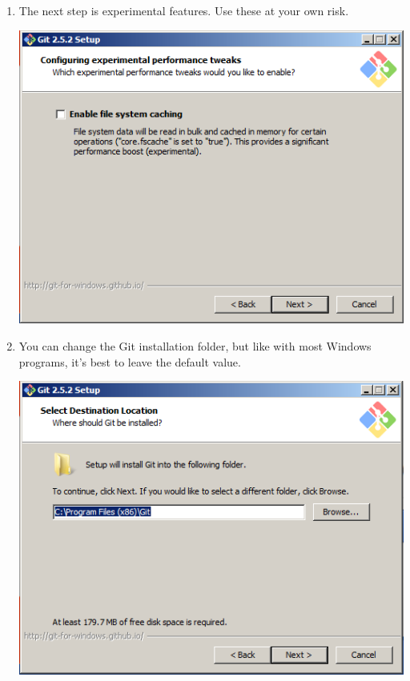 \documentclass[11pt,fleqn]{article}
\theoremstyle{definition}
\begin{document}
\begin{enumerate}[Step 1.]
\item The next step is experimental features. Use these at your own risk.
\begin{center}
\includegraphics[scale=0.6]{gitwininstall5.png}
\end{center}

\item You can change the Git installation folder, but like with most Windows programs, it's best to leave the default value.
\begin{center}
\includegraphics[scale=0.6]{gitwininstall6.png}
\end{center}


\end{enumerate}
\end{document}
